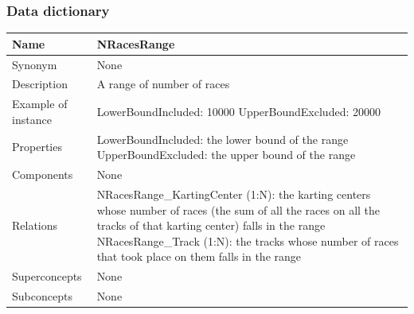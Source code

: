 \documentclass{beamer}
\begin{document}
\begin{frame}
    \frametitle{Data dictionary}
    \begin{table}
    \tiny
    \begin{tabular}{|p{2cm}|p{6cm}|}
    \hline
    Name & \textbf{NRacesRange} \\
    \hline
    Synonym & None \\
    \hline
    Description & A range of number of races \\
    \hline
    Example of instance &
    LowerBoundIncluded: 10000 \newline
    UpperBoundExcluded: 20000 \\
    \hline
    Properties &
    LowerBoundIncluded: the lower bound of the range \newline
    UpperBoundExcluded: the upper bound of the range \\
    \hline
    Components & None \\
    \hline
    Relations &
    NRacesRange\_KartingCenter (1:N): the karting centers whose number of races 
    (the sum of all the races on all the tracks of that karting center) falls in the range \newline
    NRacesRange\_Track (1:N): the tracks whose number of races that took place on them falls in the range \\
    \hline
    Superconcepts & None \\
    \hline
    Subconcepts & None \\
    \hline
    \end{tabular}
    \end{table}
\end{frame}
\end{document}
